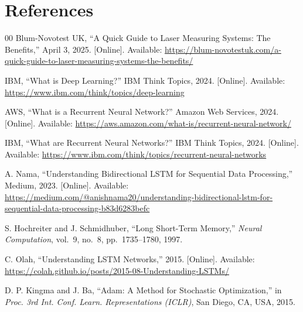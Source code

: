 \documentclass[conference]{IEEEtran}
\begin{document}
\section{References}
\begin{thebibliography}{00}
 Blum-Novotest UK, ``A Quick Guide to Laser Measuring Systems: The Benefits,'' April 3, 2025. [Online]. Available: \url{https://blum-novotestuk.com/a-quick-guide-to-laser-measuring-systems-the-benefits/}


 IBM, ``What is Deep Learning?'' IBM Think Topics, 2024. [Online]. Available: \url{https://www.ibm.com/think/topics/deep-learning}


 AWS, ``What is a Recurrent Neural Network?'' Amazon Web Services, 2024. [Online]. Available: \url{https://aws.amazon.com/what-is/recurrent-neural-network/}


 IBM, ``What are Recurrent Neural Networks?'' IBM Think Topics, 2024. [Online]. Available: \url{https://www.ibm.com/think/topics/recurrent-neural-networks}


 A. Nama, ``Understanding Bidirectional LSTM for Sequential Data Processing,'' Medium, 2023. [Online]. Available: \url{https://medium.com/@anishnama20/understanding-bidirectional-lstm-for-sequential-data-processing-b83d6283befc}

 S. Hochreiter and J. Schmidhuber, ``Long Short-Term Memory,'' \textit{Neural Computation}, vol.~9, no.~8, pp.~1735--1780, 1997.

 C. Olah, ``Understanding LSTM Networks,'' 2015. [Online]. Available: \url{https://colah.github.io/posts/2015-08-Understanding-LSTMs/}

 D. P. Kingma and J. Ba, ``Adam: A Method for Stochastic Optimization,'' in \textit{Proc. 3rd Int. Conf. Learn. Representations (ICLR)}, San Diego, CA, USA, 2015.

\end{thebibliography}
\end{document}
